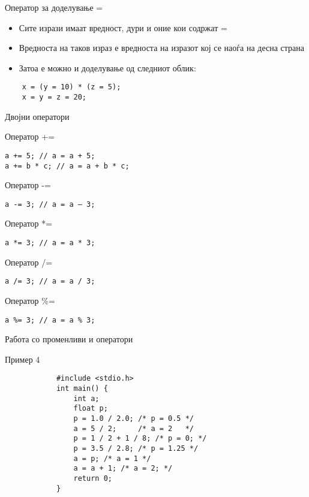 \begin{frame}[fragile]{Оператор за доделување =}
\begin{itemize}
\item Сите изрази имаат вредност, дури и оние кои содржат =
\item Вредноста на таков израз е вредноста на изразот кој се наоѓа на десна страна
\item Затоа е можно и доделување од следниот облик:
\end{itemize}
\begin{verbatim}
    x = (y = 10) * (z = 5);
    x = y = z = 20;
\end{verbatim}
\end{frame}	

\begin{frame}[fragile,shrink=5]{Двојни оператори}
\begin{block}{Оператор +=}
\begin{verbatim}
a += 5; // a = a + 5;
a += b * c; // a = a + b * c;
\end{verbatim}
\end{block}
\begin{block}{Оператор -=}
\begin{verbatim}
a -= 3; // a = a – 3;
\end{verbatim}
\end{block}
\begin{block}{Оператор *=}
\begin{verbatim}
a *= 3; // a = a * 3;
\end{verbatim}
\end{block}
\begin{block}{Оператор /=}
\begin{verbatim}
a /= 3; // a = a / 3;
\end{verbatim}
\end{block}
\begin{block}{Оператор \%=}
\begin{verbatim}
a %= 3; // a = a % 3;
\end{verbatim}
\end{block}
\end{frame}	

\begin{frame}[fragile]{Работа со променливи и оператори}
	\begin{exampleblock}{Пример 4}
		\begin{lstlisting}
			#include <stdio.h>	
			int main() {
			    int a;
			    float p;
			    p = 1.0 / 2.0; /* p = 0.5 */
			    a = 5 / 2;     /* a = 2   */
			    p = 1 / 2 + 1 / 8; /* p = 0; */
			    p = 3.5 / 2.8; /* p = 1.25 */
			    a = p; /* a = 1 */
			    a = a + 1; /* a = 2; */
			    return 0;		
			}
		\end{lstlisting}
	\end{exampleblock}
\end{frame}

